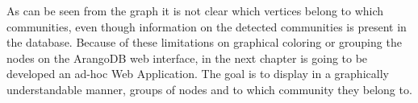 As can be seen from the graph it is not clear which vertices belong to which communities, even though information on the detected communities is present in the database. Because of these limitations on graphical coloring or grouping the nodes on the ArangoDB web interface, in the next chapter is going to be developed an ad-hoc \gls{Web Application}.
The goal is to display in a graphically understandable manner, groups of nodes and to which community they belong to.

\newpage
\thispagestyle{empty}
